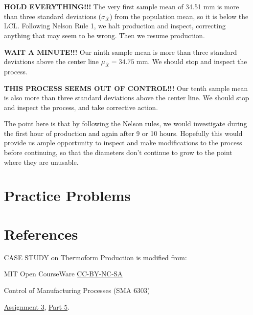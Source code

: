 \documentclass{ximera}
\begin{document}

\textbf{HOLD EVERYTHING!!!}  The very first sample mean of 34.51 mm is more than three standard deviations ($\sigma_{\bar{X}}$) from the population mean, so it is below the LCL.  %
Following Nelson Rule 1, we halt production and inspect, correcting anything that may seem to be wrong.  Then we resume production.

\textbf{WAIT A MINUTE!!!}  Our ninth sample mean is more than three standard deviations above the center line $\mu_{\bar{X}}=34.75$ mm.  We should stop and inspect the process.

\textbf{THIS PROCESS SEEMS OUT OF CONTROL!!!}  Our tenth sample mean is also more than three standard deviations above the center line.  We should stop and inspect the process, and take corrective action.

The point here is that by following the Nelson rules, we would investigate during the first hour of production and again after 9 or 10 hours.  Hopefully this would provide us ample opportunity to inspect and make modifications to the process before continuing, so that the diameters don't continue to grow to the point where they are unusable.

\section*{Practice Problems}

\section*{References}
CASE STUDY on Thermoform Production is modified from:

MIT Open CourseWare \href{https://creativecommons.org/licenses/by-nc-sa/4.0/}{CC-BY-NC-SA}

Control of Manufacturing Processes (SMA 6303)

\href{https://ocw.mit.edu/courses/2-830j-control-of-manufacturing-processes-sma-6303-spring-2008/resources/ps3/}{Assignment 3}, \href{https://ocw.mit.edu/courses/2-830j-control-of-manufacturing-processes-sma-6303-spring-2008/resources/35/}{Part 5}. 
\end{document}
